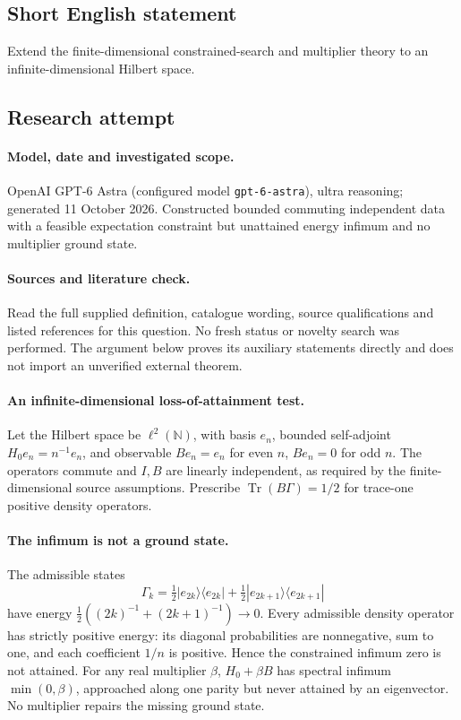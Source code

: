 \documentclass[11pt]{article}
\begin{document}
\subsection{Short English statement}
Extend the finite-dimensional constrained-search and multiplier theory to an infinite-dimensional Hilbert space.
\subsection{Research attempt}
\paragraph{Model, date and investigated scope.}
OpenAI GPT-6 Astra (configured model \texttt{gpt-6-astra}), ultra reasoning; generated 11 October 2026. Constructed bounded commuting independent data with a feasible expectation constraint but unattained energy infimum and no multiplier ground state.

\paragraph{Sources and literature check.}
Read the full supplied definition, catalogue wording, source qualifications and listed references for this question. No fresh status or novelty search was performed. The argument below proves its auxiliary statements directly and does not import an unverified external theorem.

\paragraph{An infinite-dimensional loss-of-attainment test.} Let the Hilbert space be \(\ell^2(\mathbb N)\), with basis \(e_n\), bounded self-adjoint \(H_0e_n=n^{-1}e_n\), and observable \(Be_n=e_n\) for even \(n\), \(Be_n=0\) for odd \(n\). The operators commute and \(I,B\) are linearly independent, as required by the finite-dimensional source assumptions. Prescribe \(\operatorname{Tr}(B\Gamma)=1/2\) for trace-one positive density operators.
\paragraph{The infimum is not a ground state.} The admissible states
\[
 \Gamma_k=\tfrac12|e_{2k}\rangle\langle e_{2k}|+
 \tfrac12|e_{2k+1}\rangle\langle e_{2k+1}|
\]
have energy \(\tfrac12((2k)^{-1}+(2k+1)^{-1})\to0\). Every admissible density operator has strictly positive energy: its diagonal probabilities are nonnegative, sum to one, and each coefficient \(1/n\) is positive. Hence the constrained infimum zero is not attained. For any real multiplier \(\beta\), \(H_0+\beta B\) has spectral infimum \(\min(0,\beta)\), approached along one parity but never attained by an eigenvector. No multiplier repairs the missing ground state.
\end{document}
